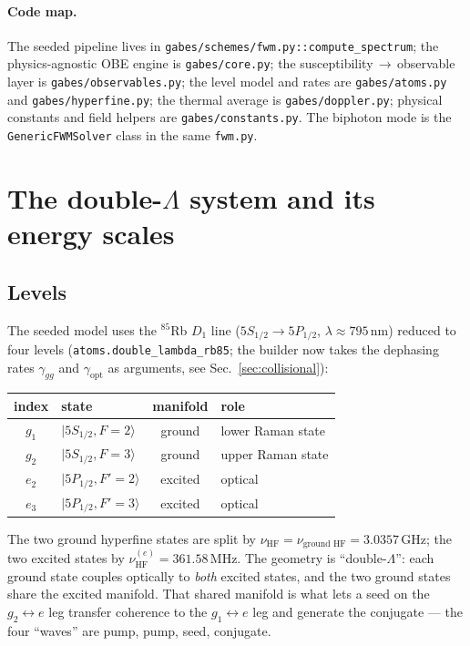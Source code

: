 \documentclass[11pt]{article}
\newcommand{\ket}[1]{\lvert #1 \rangle}
\newcommand{\HF}{\mathrm{HF}}
\newcommand{\code}[1]{\texttt{#1}}
\begin{document}
\paragraph{Code map.} The seeded pipeline lives in
\code{gabes/schemes/fwm.py::compute\_spectrum}; the physics-agnostic OBE engine is
\code{gabes/core.py}; the susceptibility$\,\to\,$observable layer is
\code{gabes/observables.py}; the level model and rates are
\code{gabes/atoms.py} and \code{gabes/hyperfine.py}; the thermal average is
\code{gabes/doppler.py}; physical constants and field helpers are
\code{gabes/constants.py}. The biphoton mode is the
\code{GenericFWMSolver} class in the same \code{fwm.py}.

\section{The double-\boldmath$\Lambda$ system and its energy scales}

\subsection{Levels}

The seeded model uses the $^{85}$Rb $D_1$ line ($5S_{1/2}\!\to\!5P_{1/2}$,
$\lambda \approx 795\,$nm) reduced to four levels (\code{atoms.double\_lambda\_rb85};
the builder now takes the dephasing rates $\gamma_{gg}$ and
$\gamma_{\text{opt}}$ as arguments, see Sec.~\ref{sec:collisional}):

\begin{center}
\begin{tabular}{clcl}
\toprule
index & state & manifold & role \\
\midrule
$g_1$ & $\ket{5S_{1/2},F=2}$ & ground & lower Raman state \\
$g_2$ & $\ket{5S_{1/2},F=3}$ & ground & upper Raman state \\
$e_2$ & $\ket{5P_{1/2},F'=2}$ & excited & optical \\
$e_3$ & $\ket{5P_{1/2},F'=3}$ & excited & optical \\
\bottomrule
\end{tabular}
\end{center}

The two ground hyperfine states are split by
$\nu_{\HF}=\nu_{\text{ground HF}}=3.0357\,$GHz; the two excited states by
$\nu^{(e)}_{\HF}=361.58\,$MHz. The geometry is ``double-$\Lambda$'': each ground
state couples optically to \emph{both} excited states, and the two ground states
share the excited manifold. That shared manifold is what lets a seed on the
$g_2\!\leftrightarrow\!e$ leg transfer coherence to the $g_1\!\leftrightarrow\!e$
leg and generate the conjugate --- the four ``waves'' are pump, pump, seed,
conjugate.
\end{document}
